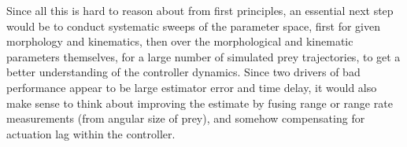 \documentclass[12pt]{article}
\begin{document}
Since all this is hard to reason about
from first principles, an essential next step would be to conduct 
systematic sweeps of the parameter space, first for given morphology
and kinematics, then over the morphological and kinematic parameters themselves,
for a large number of simulated prey trajectories, to get a better understanding
of the controller dynamics. Since two drivers of bad performance appear to
be large estimator error and time delay, it would also make sense to think
about improving the estimate by fusing range or range rate measurements (from
angular size of prey), and somehow compensating for actuation lag within
the controller.

\printbibliography[heading=bibintoc]



%
\end{document}
